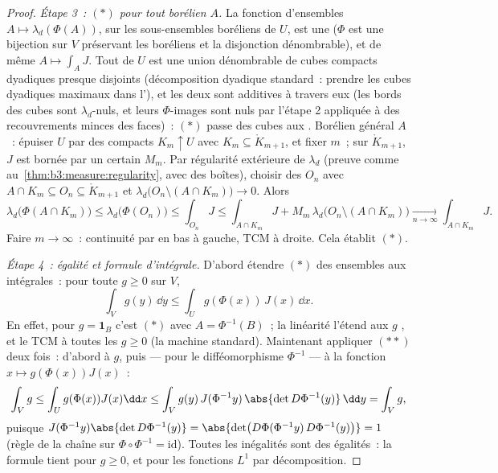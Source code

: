 \begin{proof}
\emph{Étape 3~: $(*)$ pour tout borélien $A$.} La fonction
d'ensembles $A \mapsto \lambda_d(\Phi(A))$, sur les
sous-ensembles boréliens de $U$, est une  ($\Phi$ est
une bijection sur $V$ préservant les boréliens et la
disjonction dénombrable), et de même $A \mapsto \int_AJ$.
Tout  de $U$ est une union dénombrable de cubes
compacts dyadiques presque disjoints (décomposition dyadique
standard~: prendre les cubes dyadiques maximaux  dans
l'), et les deux  sont additives à travers eux
(les bords des cubes sont $\lambda_d$-nuls, et leurs
$\Phi$-images sont nuls par l'étape 2 appliquée à des
recouvrements minces des faces)~: $(*)$ passe des cubes aux
. Borélien général $A$~: épuiser $U$ par des compacts
$K_m \uparrow U$ avec $K_m \subseteq \mathring K_{m+1}$, et
fixer $m$~; sur $\mathring K_{m+1}$, $J$ est bornée par un
certain $M_m$. Par régularité extérieure de $\lambda_d$
(preuve comme au~\cref{thm:b3:measure:regularity}, avec des
boîtes), choisir des  $O_n$ avec $A \cap K_m \subseteq
O_n \subseteq \mathring K_{m+1}$ et $\lambda_d\bigl(O_n
\setminus (A\cap K_m)\bigr) \to 0$. Alors
\[
\lambda_d\bigl(\Phi(A\cap K_m)\bigr) \leq
\lambda_d\bigl(\Phi(O_n)\bigr) \leq \int_{O_n}J
\leq \int_{A\cap K_m}J + M_m\,\lambda_d\bigl(O_n\setminus(A\cap
K_m)\bigr) \xrightarrow[n\to\infty]{} \int_{A\cap K_m}J .
\]
Faire $m \to \infty$~: continuité par en bas à gauche, TCM à
droite. Cela établit $(*)$.

\emph{Étape 4~: égalité et formule d'intégrale.} D'abord
étendre $(*)$ des ensembles aux intégrales~: pour toute $g
\geq 0$  sur $V$,
\[
\int_V g(y)\,\dd y \leq \int_U g(\Phi(x))\,J(x)\,\dd x .
\tag{$**$}
\]
En effet, pour $g = \mathbf 1_B$ c'est $(*)$ avec $A =
\Phi^{-1}(B)$~; la linéarité l'étend aux $g$ , et le
TCM à toutes les $g \geq 0$ (la machine standard). Maintenant
appliquer $(**)$ deux fois~: d'abord à $g$, puis --- pour le
difféomorphisme $\Phi^{-1}$ --- à la fonction $x \mapsto
g(\Phi(x))J(x)$~:
\[
\int_Vg \leq \int_U g(\Phi(x))J(x)\dd x
\leq \int_V g(y)\,J(\Phi^{-1}y)\,\abs{\det
D\Phi^{-1}(y)}\,\dd y = \int_V g ,
\]
puisque $J(\Phi^{-1}y)\abs{\det D\Phi^{-1}(y)} = \abs{\det\bigl(
D\Phi(\Phi^{-1}y)\,D\Phi^{-1}(y)\bigr)} = 1$ (règle de la
chaîne sur $\Phi\circ\Phi^{-1} = \mathrm{id}$). Toutes les
inégalités sont des égalités~: la formule tient pour $g \geq
0$, et pour les fonctions $L^1$ par décomposition.
\end{proof}

